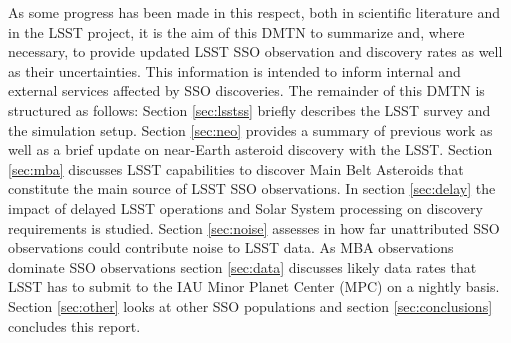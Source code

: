 As some progress has been made in this respect, both in scientific literature and in the LSST project, it is the aim of this DMTN to summarize and, where necessary, to provide updated LSST SSO observation and discovery rates as well as their uncertainties. This information is intended to inform internal and external services affected by SSO discoveries.
The remainder of this DMTN is structured as follows: Section \ref{sec:lsstss} briefly describes the LSST survey and the simulation setup. Section \ref{sec:neo} provides a summary of previous work as well as a brief update on near-Earth asteroid discovery with the LSST. Section \ref{sec:mba} discusses LSST capabilities to discover Main Belt Asteroids that constitute the main source of LSST SSO observations. In section \ref{sec:delay} the impact of delayed LSST operations and Solar System processing on discovery requirements is studied. Section \ref{sec:noise} assesses in how far unattributed SSO observations could contribute noise to LSST data. As MBA observations dominate SSO observations section \ref{sec:data} discusses likely data rates that LSST has to submit to the IAU Minor Planet Center (MPC) on a nightly basis. Section \ref{sec:other}  looks at other SSO populations and section \ref{sec:conclusions} concludes this report.

%
